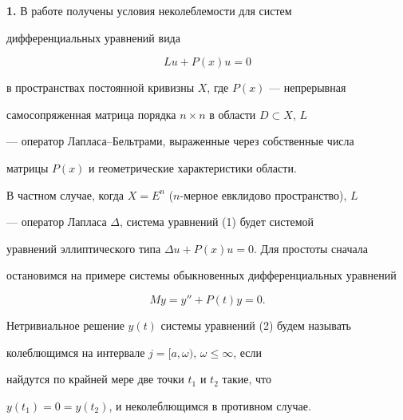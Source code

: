 \label{begin} 


 


 


{\bf 1.} В работе получены условия неколеблемости для систем 


дифференциальных уравнений вида 


\begin{equation} 


Lu+ P(x)u=0 


\end{equation} 


в пространствах постоянной кривизны $X$, где $P(x)$ --- непрерывная 


самосопряженная матрица порядка $n\times n$ в области $D\subset X$, $L$ 


--- оператор Лапласа--Бельтрами, выраженные через собственные числа 


матрицы $P(x)$ и геометрические характеристики области. 


 


В частном случае, когда $X=E^n$ ($n$-мерное евклидово пространство), $L$ 


--- оператор Лапласа $\Delta$, система уравнений (1) будет системой 


уравнений эллиптического типа $\Delta u+P(x)u=0$. Для простоты сначала 


остановимся на примере системы обыкновенных дифференциальных уравнений 


\begin{equation} 


My=y''+P(t)y=0. 


\end{equation} 


 


\begin{defn} 


Нетривиальное решение $y(t)$ системы уравнений (2) будем называть 


колеблющимся на интервале $j=[a,\omega)$, $\omega\le\infty$, если 


найдутся по крайней мере две точки $t_1$ и $t_2$ такие, что 


$y(t_1)=0=y(t_2)$, и неколеблющимся в противном случае. 


\end{defn} 


 


